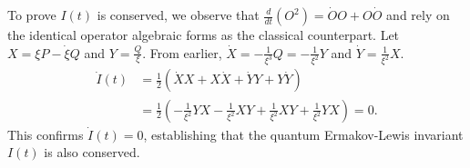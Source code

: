 \documentclass{article}
\begin{document}
\begin{enumerate}[label=\fbox{\arabic*}]
\begin{enumerate}[label=(\roman*)]
\[          \]
          To prove $I(t)$ is conserved, we observe that $\frac{d}{dt}(O^2) = \dot{O}O + O\dot{O}$ and rely on the identical operator algebraic forms as the classical counterpart. Let $X = \xi P - \dot{\xi} Q$ and $Y = \frac{Q}{\xi}$. From earlier, $\dot{X} = -\frac{1}{\xi^3} Q = -\frac{1}{\xi^2} Y$ and $\dot{Y} = \frac{1}{\xi^2} X$.
          \begin{align*}
            \dot{I}(t) &= \frac{1}{2} (\dot{X}X + X\dot{X} + \dot{Y}Y + Y\dot{Y}) \\
            &= \frac{1}{2} \left( -\frac{1}{\xi^2}YX - \frac{1}{\xi^2}XY + \frac{1}{\xi^2}XY + \frac{1}{\xi^2}YX \right) = 0.
          \end{align*}
          This confirms $\dot{I}(t) = 0$, establishing that the quantum Ermakov-Lewis invariant $I(t)$ is also conserved.
        \end{enumerate}
\end{enumerate}
\end{document}
